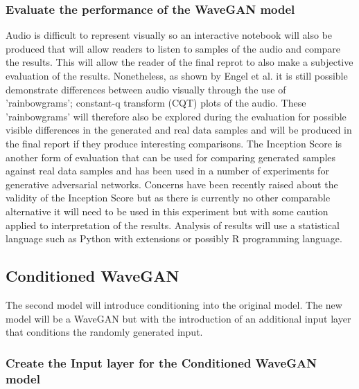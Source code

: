 \documentclass[a4paper, titlepage]{article}
\begin{document}
\subsubsection{Evaluate the performance of the WaveGAN model}

Audio is difficult to represent visually so an interactive notebook will also be produced that will allow readers to listen to samples of the audio and compare the results.
This will allow the reader of the final reprot to also make a subjective evaluation of the results.
\newline
\newline
Nonetheless, as shown by Engel et al. it is still possible demonstrate differences between audio visually through the use of 'rainbowgrams'; constant-q transform (CQT) plots of the audio.
These 'rainbowgrams' will therefore also be explored during the evaluation for possible visible differences in the generated and real data samples and will be produced in the final report if they produce interesting comparisons.
\newline
\newline
The Inception Score is another form of evaluation that can be used for comparing generated samples against real data samples and has been used in a number of experiments for generative adversarial networks.
Concerns have been recently raised about the validity of the Inception Score but as there is currently no other comparable alternative it will need to be used in this experiment but with some caution applied to interpretation of the results.
\newline
\newline
Analysis of results will use a statistical language such as Python with extensions or possibly R programming language.

\subsection{Conditioned WaveGAN}

The second model will introduce conditioning into the original model.
The new model will be a WaveGAN but with the introduction of an additional input layer that conditions the randomly generated input.

\subsubsection{Create the Input layer for the Conditioned WaveGAN model}
\end{document}
